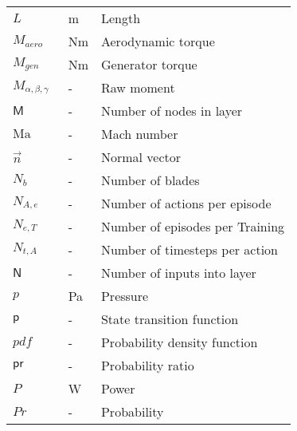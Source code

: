 \begin{longtable}{p{5cm}p{4cm}p{5cm}}
    $L$						& \SI{}{m}		& Length \\
    $M_{aero}$				& \SI{}{Nm}		& Aerodynamic torque \\
    $M_{gen}$				& \SI{}{Nm}		& Generator torque \\
    $M_{\alpha, \beta, \gamma}$	& \SI{}{-}	& Raw moment \\
    $\mathsf{M}$			& \SI{}{-}		& Number of nodes in layer \\
    $\mathrm{Ma}$			& \SI{}{-}		& Mach number \\
    $\vec{n}$ 				& \SI{}{-}		& Normal vector \\
    $N_b$					& \SI{}{-}		& Number of blades \\
    $N_{A,e}$				& \SI{}{-}		& Number of actions per episode \\
    $N_{e,T}$				& \SI{}{-}		& Number of episodes per Training \\
    $N_{t,A}$				& \SI{}{-}		& Number of timesteps per action \\
    $\mathsf{N}$			& \SI{}{-}		& Number of inputs into layer \\
    $p$                     & \SI{}{Pa}     & Pressure \\
    $\mathsf{p}$			& \SI{}{-}		& State transition function \\
    $pdf$					& \SI{}{-}		& Probability density function \\
    $\mathsf{pr}$			& \SI{}{-}		& Probability ratio \\
    $P$						& \SI{}{W}		& Power \\
    $Pr$					& \SI{}{-}		& Probability \\

\end{longtable}
